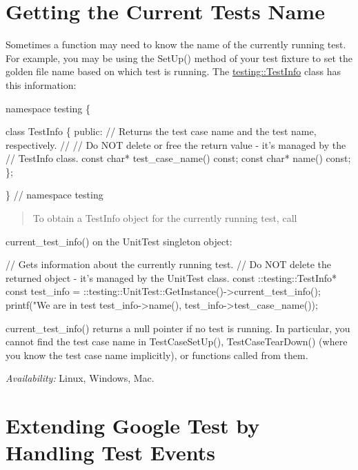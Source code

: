 \section*{Getting the Current Test\textquotesingle{}s Name}

Sometimes a function may need to know the name of the currently running test. For example, you may be using the {\ttfamily Set\+Up()} method of your test fixture to set the golden file name based on which test is running. The {\ttfamily \hyperlink{classtesting_1_1_test_info}{testing\+::\+Test\+Info}} class has this information\+:


\begin{DoxyCode}
namespace testing \{

class TestInfo \{
 public:
  // Returns the test case name and the test name, respectively.
  //
  // Do NOT delete or free the return value - it's managed by the
  // TestInfo class.
  const char* test\_case\_name() const;
  const char* name() const;
\};

\}  // namespace testing
\end{DoxyCode}


\begin{quote}
To obtain a {\ttfamily Test\+Info} object for the currently running test, call \end{quote}
{\ttfamily current\+\_\+test\+\_\+info()} on the {\ttfamily Unit\+Test} singleton object\+:


\begin{DoxyCode}
// Gets information about the currently running test.
// Do NOT delete the returned object - it's managed by the UnitTest class.
const ::testing::TestInfo* const test\_info =
  ::testing::UnitTest::GetInstance()->current\_test\_info();
printf("We are in test %
       test\_info->name(), test\_info->test\_case\_name());
\end{DoxyCode}


{\ttfamily current\+\_\+test\+\_\+info()} returns a null pointer if no test is running. In particular, you cannot find the test case name in {\ttfamily Test\+Case\+Set\+Up()}, {\ttfamily Test\+Case\+Tear\+Down()} (where you know the test case name implicitly), or functions called from them.

{\itshape Availability\+:} Linux, Windows, Mac.

\section*{Extending Google Test by Handling Test Events}

